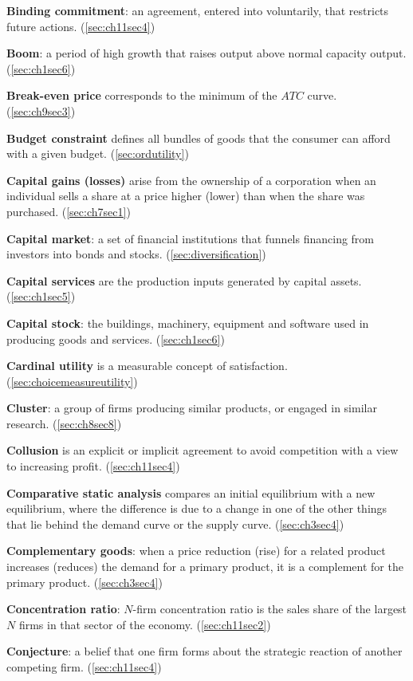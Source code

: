 \textbf{Binding commitment}: an agreement, entered into voluntarily, that restricts future actions. (\ref{sec:ch11sec4})

\textbf{Boom}: a period of high growth that raises output above normal capacity output. (\ref{sec:ch1sec6})

\textbf{Break-even price} corresponds to the minimum of the $ATC$ curve. (\ref{sec:ch9sec3})

\textbf{Budget constraint} defines all bundles of goods that the consumer can afford with a given budget. (\ref{sec:ordutility})

\textbf{Capital gains (losses)} arise from the ownership of a corporation when an individual sells a share at a price higher (lower) than when the share was purchased. (\ref{sec:ch7sec1})

\textbf{Capital market}: a set of financial institutions that funnels financing from investors into bonds and stocks. (\ref{sec:diversification})

\textbf{Capital services} are the production inputs generated by capital assets. (\ref{sec:ch1sec5})

\textbf{Capital stock}: the buildings, machinery, equipment and software used in producing goods and services. (\ref{sec:ch1sec6})

\textbf{Cardinal utility} is a measurable concept of satisfaction. (\ref{sec:choicemeasureutility})

\textbf{Cluster}: a group of firms producing similar products, or engaged in similar research. (\ref{sec:ch8sec8})

\textbf{Collusion} is an explicit or implicit agreement to avoid competition with a view to increasing profit. (\ref{sec:ch11sec4})

\textbf{Comparative static analysis} compares an initial equilibrium with a new equilibrium, where the difference is due to a change in one of the other things that lie behind the demand curve or the supply curve. (\ref{sec:ch3sec4})

\textbf{Complementary goods}: when a price reduction (rise) for a related product increases (reduces) the demand for a primary product, it is a complement for the primary product. (\ref{sec:ch3sec4})

\textbf{Concentration ratio}: $N$-firm concentration ratio is the sales share of the largest $N$ firms in that sector of the economy. (\ref{sec:ch11sec2})

\textbf{Conjecture}: a belief that one firm forms about the strategic reaction of another competing firm. (\ref{sec:ch11sec4})

